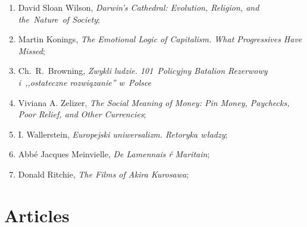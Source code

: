 \documentclass[a4paper,11pt]{article}
\begin{document}
\begin{enumerate}
\item David Sloan Wilson, \emph{Darwin's Cathedral: Evolution,
    Religion, and the~Nature~of Society};
\item Martin Konings, \emph{The Emotional Logic of Capitalism. What
    Progressives Have Missed};
\item Ch.~R.~Browning, \emph{Zwykli ludzie. 101~Policyjny Batalion
    Rezerwowy i~,,ostateczne rozwiązanie'' w~Polsce}
\item Viviana A. Zelizer, \emph{The Social Meaning of Money: Pin
    Money, Paychecks, Poor Relief, and Other Currencies};
\item I. Wallerstein, \emph{Europejski uniwersalizm. Retoryka władzy};
\item Abbé Jacques Meinvielle, \emph{De Lamennais ŕ Maritain};
\item Donald Ritchie, \emph{The Films of Akira Kurosawa};
\end{enumerate}










\newpage
\section{Articles}

\vspace{\spaceTwo}
\end{document}
